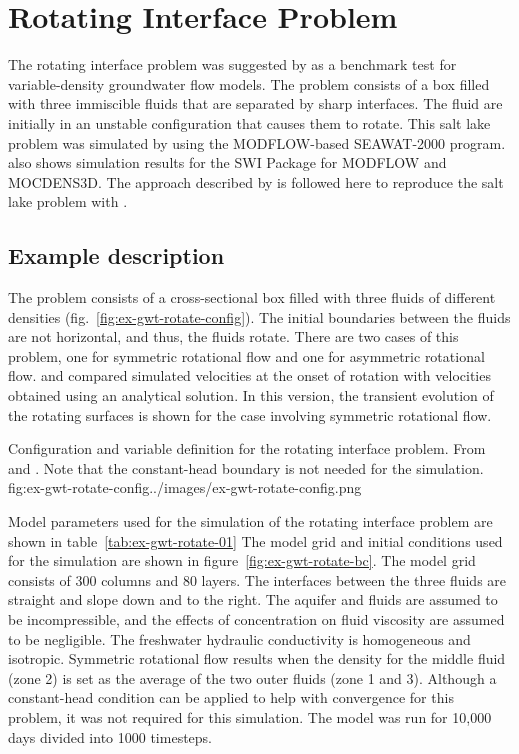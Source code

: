 \section{Rotating Interface Problem}

The rotating interface problem was suggested by \cite{bakker2004} as a  benchmark test for variable-density groundwater flow models. The problem consists of a box filled with three immiscible fluids that are separated by sharp interfaces.  The fluid are initially in an unstable configuration that causes them to rotate.  This salt lake problem was simulated by \cite{langevin2003seawat} using the MODFLOW-based SEAWAT-2000 program.  \cite{bakker2004} also shows simulation results for the SWI Package for MODFLOW and MOCDENS3D.  The approach described by   \cite{langevin2003seawat} is followed here to reproduce the salt lake problem with \mf.

\subsection{Example description}

 The problem consists of a cross-sectional box filled with three fluids of different densities (fig.~\ref{fig:ex-gwt-rotate-config}). The initial boundaries between the fluids are not horizontal, and thus, the fluids rotate. There are two cases of this problem, one for symmetric rotational flow and one for asymmetric rotational flow.  \cite{bakker2004} and \cite{langevin2003seawat} compared simulated velocities at the onset of rotation with velocities obtained using an analytical solution.  In this \mf version, the transient evolution of the rotating surfaces is shown for the case involving symmetric rotational flow.
 
\begin{StandardFigure}{
                                     Configuration and variable definition for the rotating interface problem.  From \cite{bakker2004} and \cite{langevin2003seawat}.  Note that the constant-head boundary is not needed for the \mf simulation.
                                     }{fig:ex-gwt-rotate-config}{../images/ex-gwt-rotate-config.png}
\end{StandardFigure}            

Model parameters used for the \mf simulation of the rotating interface problem are shown in table~\ref{tab:ex-gwt-rotate-01} The model grid and initial conditions used for the \mf simulation are shown in figure~\ref{fig:ex-gwt-rotate-bc}. The model grid consists of 300 columns and 80 layers.  The interfaces between the three fluids are straight and slope down and to the right. The aquifer and fluids are assumed to be incompressible, and the effects of concentration on fluid viscosity are assumed to be negligible. The freshwater hydraulic conductivity is homogeneous and isotropic. Symmetric rotational flow results when the density for the middle fluid (zone 2) is set as the average of the two outer fluids (zone 1 and 3).   Although a constant-head condition can be applied to help with convergence for this problem, it was not required for this \mf simulation.  The \mf model was run for 10,000 days  divided into 1000 timesteps. 

